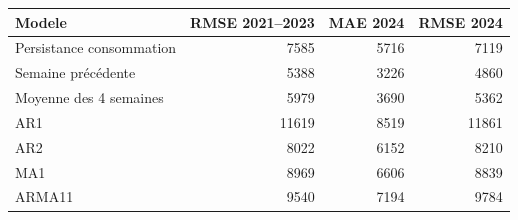 \begin{tabular}{lrrr}
\toprule
Modele & RMSE 2021--2023 & MAE 2024 & RMSE 2024 \\
\midrule
Persistance consommation & 7585 & 5716 & 7119 \\
Semaine précédente & 5388 & 3226 & 4860 \\
Moyenne des 4 semaines & 5979 & 3690 & 5362 \\
AR1 & 11619 & 8519 & 11861 \\
AR2 & 8022 & 6152 & 8210 \\
MA1 & 8969 & 6606 & 8839 \\
ARMA11 & 9540 & 7194 & 9784 \\
\bottomrule
\end{tabular}
